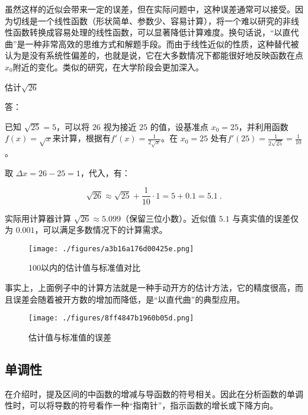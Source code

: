 虽然这样的近似会带来一定的误差，但在实际问题中，这种误差通常可以接受。因为切线是一个线性函数（形状简单、参数少、容易计算），将一个难以研究的非线性函数转换成容易处理的线性函数，可以显著降低计算难度。换句话说，“以直代曲”是一种非常高效的思维方式和解题手段。而由于线性近似的性质，这种替代被认为是没有系统性偏差的，也就是说，它在大多数情况下都能很好地反映函数在点$x_0$附近的变化。类似的研究，在大学阶段会更加深入。

\begin{example}{估计$\sqrt{26}$}

答：

已知 $\sqrt{25} = 5$，可以将 $26$ 视为接近 $25$ 的值，设基准点 $x_0 = 25$，并利用函数 $f(x) = \sqrt{x}$来计算，根据有$\displaystyle f'(x) = \frac{1}{2\sqrt{x}}$。在 $x_0 = 25$ 处有$\displaystyle f'(25) = \frac{1}{2\sqrt{25}} = \frac{1}{10}$。

取 $\Delta x = 26 - 25 = 1$，代入，有：

\begin{equation}
\sqrt{26} \approx \sqrt{25} + \frac{1}{10} \cdot 1 = 5 + 0.1 = 5.1~.
\end{equation}

实际用计算器计算 $\sqrt{26} \approx 5.099$（保留三位小数）。近似值 $5.1$ 与真实值的误差仅为 $0.001$，可以满足多数情况下的计算需求。
\end{example}

\begin{figure}[ht]
\centering
\texttt{[image: ./figures/a3b16a176d00425e.png]}
\caption{100以内的估计值与标准值对比} \label{fig_HsDerC_1}
\end{figure}

事实上，上面例子中的计算方法就是一种手动开方的估计方法，它的精度很高，而且误差会随着被开方数的增加而降低，是“以直代曲”的典型应用。

\begin{figure}[ht]
\centering
\texttt{[image: ./figures/8ff4847b1960b05d.png]}
\caption{估计值与标准值的误差} \label{fig_HsDerC_2}
\end{figure}

\subsection{单调性}

在介绍时，提及区间的中函数的增减与导函数的符号相关。因此在分析函数的单调性时，可以将导数的符号看作一种“指南针”，指示函数的增长或下降方向。

